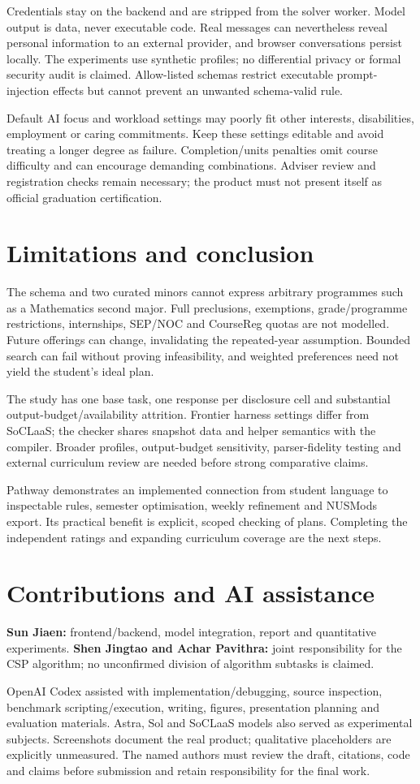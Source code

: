 Credentials stay on the backend and are stripped from the solver worker. Model output is data, never executable code. Real messages can nevertheless reveal personal information to an external provider, and browser conversations persist locally. The experiments use synthetic profiles; no differential privacy or formal security audit is claimed. Allow-listed schemas restrict executable prompt-injection effects but cannot prevent an unwanted schema-valid rule.

Default AI focus and workload settings may poorly fit other interests, disabilities, employment or caring commitments. Keep these settings editable and avoid treating a longer degree as failure. Completion/units penalties omit course difficulty and can encourage demanding combinations. Adviser review and registration checks remain necessary; the product must not present itself as official graduation certification.

\section{Limitations and conclusion}
The schema and two curated minors cannot express arbitrary programmes such as a Mathematics second major. Full preclusions, exemptions, grade/programme restrictions, internships, SEP/NOC and CourseReg quotas are not modelled. Future offerings can change, invalidating the repeated-year assumption. Bounded search can fail without proving infeasibility, and weighted preferences need not yield the student's ideal plan.

The study has one base task, one response per disclosure cell and substantial output-budget/availability attrition. Frontier harness settings differ from SoCLaaS; the checker shares snapshot data and helper semantics with the compiler. Broader profiles, output-budget sensitivity, parser-fidelity testing and external curriculum review are needed before strong comparative claims.

Pathway demonstrates an implemented connection from student language to inspectable rules, semester optimisation, weekly refinement and NUSMods export. Its practical benefit is explicit, scoped checking of plans. Completing the independent ratings and expanding curriculum coverage are the next steps.

\section*{Contributions and AI assistance}
\textbf{Sun Jiaen:} frontend/backend, model integration, report and quantitative experiments. \textbf{Shen Jingtao and Achar Pavithra:} joint responsibility for the CSP algorithm; no unconfirmed division of algorithm subtasks is claimed.

OpenAI Codex assisted with implementation/debugging, source inspection, benchmark scripting/execution, writing, figures, presentation planning and evaluation materials. Astra, Sol and SoCLaaS models also served as experimental subjects. Screenshots document the real product; qualitative placeholders are explicitly unmeasured. The named authors must review the draft, citations, code and claims before submission and retain responsibility for the final work.
